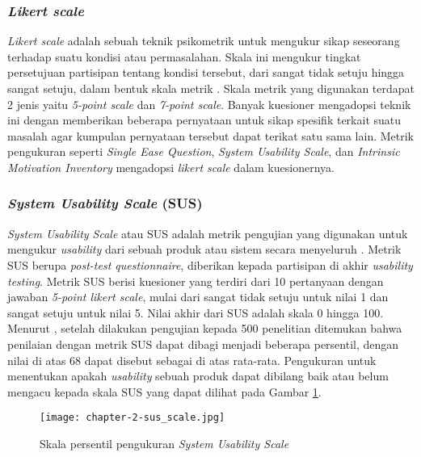 \subsubsection{\textit{Likert scale}}
\label{subsubsec:likert_scale}
\textit{Likert scale} adalah sebuah teknik psikometrik untuk mengukur sikap seseorang terhadap suatu kondisi atau permasalahan. Skala ini mengukur tingkat persetujuan partisipan tentang kondisi tersebut, dari sangat tidak setuju hingga sangat setuju, dalam bentuk skala metrik \parencite{likert2015joshi}. Skala metrik yang digunakan terdapat 2 jenis yaitu \textit{5-point scale} dan \textit{7-point scale}. Banyak kuesioner mengadopsi teknik ini dengan memberikan beberapa pernyataan untuk sikap spesifik terkait suatu masalah agar kumpulan pernyataan tersebut dapat terikat satu sama lain. Metrik pengukuran seperti \textit{Single Ease Question}, \textit{System Usability Scale}, dan \textit{Intrinsic Motivation Inventory} mengadopsi \textit{likert scale} dalam kuesionernya. 

\subsubsection{\textit{System Usability Scale} (SUS)}
\label{subsubsec:sus}
\textit{System Usability Scale} atau SUS adalah metrik pengujian yang digunakan untuk mengukur \textit{usability} dari sebuah produk atau sistem secara menyeluruh \parencite{sus1995brooke}. Metrik SUS berupa \textit{post-test questionnaire}, diberikan kepada partisipan di akhir \textit{usability testing}. Metrik SUS berisi kuesioner yang terdiri dari 10 pertanyaan dengan jawaban \textit{5-point likert scale}, mulai dari sangat tidak setuju untuk nilai 1 dan sangat setuju untuk nilai 5. Nilai akhir dari SUS adalah skala 0 hingga 100. Menurut \textcite{sus2008bangor}, setelah dilakukan pengujian kepada 500 penelitian ditemukan bahwa penilaian dengan metrik SUS dapat dibagi menjadi beberapa persentil, dengan nilai di atas 68 dapat disebut sebagai di atas rata-rata. Pengukuran untuk menentukan apakah \textit{usability} sebuah produk dapat dibilang baik atau belum mengacu kepada skala SUS yang dapat dilihat pada Gambar \ref{img:sus_scale}.

\begin{figure}[h]
  \centering
  \texttt{[image: chapter-2-sus\_scale.jpg]}
  \caption{Skala persentil pengukuran \textit{System Usability Scale} \parencite{sus2008bangor}}
  \label{img:sus_scale}
\end{figure}
\FloatBarrier

